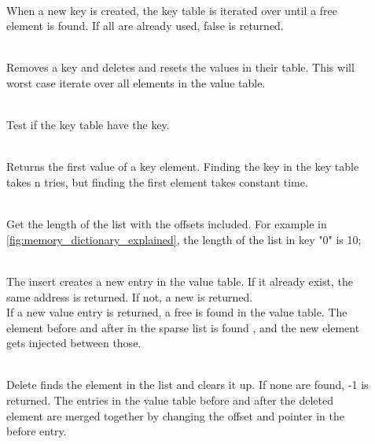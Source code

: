 \begin{description}
  \item[]\hfill\\
  When a new key is created, the key table is iterated over until a free element
  is found. If all are already used, false is returned.

  \item[]\hfill\\
  Removes a key and deletes and resets the values in their table. This will
  worst case iterate over all elements in the value table.

  \item[]\hfill\\
  Test if the key table have the key.

  \item[]\hfill\\
  Returns the first value of a key element. Finding the key in the key table takes
  n tries, but finding the first element takes constant time.

  \item[]\hfill\\
  Get the length of the list with the offsets included. For example in
  \autoref{fig:memory_dictionary_explained}, the length of the list in
		key "0" is 10;

  \item[]\hfill\\
  The insert creates a new entry in the value table. If it already exist, the
  same address is returned. If not, a new is returned. \\
  If a new value entry is returned, a free is found in the value table.
  The element before and after in the sparse list is found , and the new element
  gets injected between those.

  \item[]\hfill\\
  Delete finds the element in the list and clears it up. If none are found, -1 is
  returned. The entries in the value table before and after the deleted element
  are merged together by changing the offset and pointer in the before entry.



\end{description}
